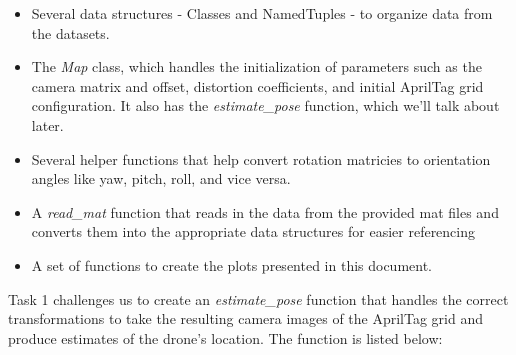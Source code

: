 \documentclass{article}
\begin{document}
\begin{itemize}
    \item Several data structures - Classes and NamedTuples - to organize data from the datasets.
    \item The \textit{Map} class, which handles the initialization of parameters such as the camera matrix and offset, distortion coefficients, and initial AprilTag grid configuration. It also has the \textit{estimate\_pose} function, which we'll talk about later.
    \item Several helper functions that help convert rotation matricies to orientation angles like yaw, pitch, roll, and vice versa.
    \item A \textit{read\_mat} function that reads in the data from the provided mat files and converts them into the appropriate data structures for easier referencing
    \item A set of functions to create the plots presented in this document.
\end{itemize}

Task 1 challenges us to create an \textit{estimate\_pose} function that handles the correct transformations to take the resulting camera images of the AprilTag grid and produce estimates of the drone's location. The function is listed below:
\end{document}
